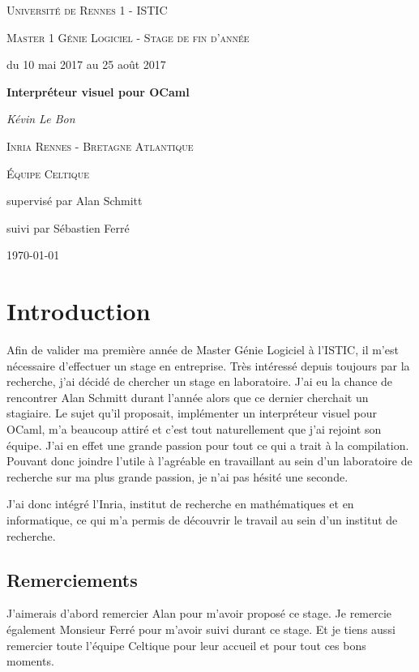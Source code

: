 \documentclass[a4paper,10pt]{article}
\begin{document}
\begin{titlepage}
  \centering
  {\scshape\LARGE
    Université de Rennes 1 - ISTIC\par}
  \vspace{0.75cm}
  {\scshape\Large Master 1 Génie Logiciel - Stage de fin d'année\par}
  {du 10 mai 2017 au 25 août 2017\par}
  \vspace{1.5cm}
  {\huge\bfseries Interpréteur visuel pour OCaml\par}
  \vspace{2cm}
  {\Large\itshape Kévin Le Bon\par}
  \vspace{1cm}
  {\scshape\Large Inria Rennes - Bretagne Atlantique\par}
  {\scshape\large Équipe Celtique\par}
  \vfill
  {\large supervisé par Alan Schmitt\par
  suivi par Sébastien Ferré}
  \vfill
  \today\par
\end{titlepage}

\section*{Introduction}
Afin de valider ma première année de Master Génie Logiciel à l'ISTIC, il 
m'est nécessaire d'effectuer un stage en entreprise. Très intéressé depuis 
toujours par la recherche, j'ai décidé de chercher un stage en laboratoire. J'ai 
eu la chance de rencontrer Alan Schmitt durant l'année alors que ce dernier 
cherchait un stagiaire. Le sujet qu'il proposait, implémenter un interpréteur 
visuel pour OCaml, m'a beaucoup attiré et c'est tout naturellement que j'ai 
rejoint son équipe. J'ai en effet une grande passion pour tout ce qui a trait à 
la compilation. Pouvant donc joindre l'utile à l'agréable en travaillant au 
sein d'un laboratoire de recherche sur ma plus grande passion, je n'ai pas 
hésité une seconde.

J'ai donc intégré l'Inria, institut de recherche en mathématiques et en 
informatique, ce qui m'a permis de découvrir le travail au sein d'un institut 
de recherche.

\subsection*{Remerciements}
J'aimerais d'abord remercier Alan pour m'avoir proposé ce stage. Je remercie 
également Monsieur Ferré pour m'avoir suivi durant ce stage. Et je tiens
aussi remercier toute l'équipe Celtique pour leur accueil et pour tout ces bons 
moments.
\end{document}

